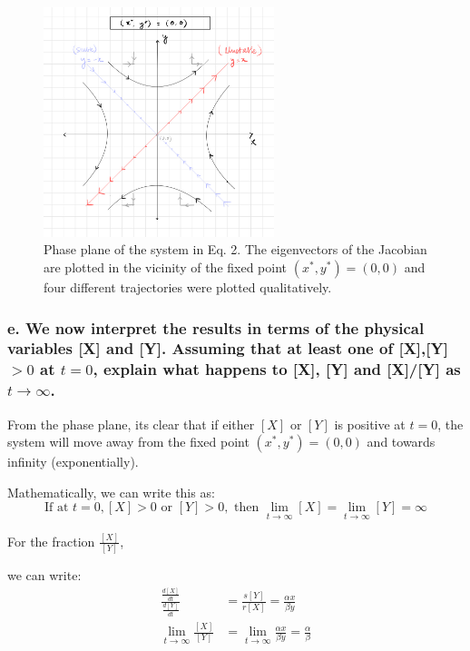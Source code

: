 \documentclass[12pt]{article}
\begin{document}
\begin{figure}[htbp]
    \centering
    \includegraphics[width=0.6\textwidth]{figures/q1_sketch.jpeg}
    \caption{\centering Phase plane of the system in Eq. 2. The eigenvectors of the Jacobian are plotted in the vicinity of the fixed point $(x^*,y^*) = (0,0)$ and four different trajectories were plotted qualitatively.}
\end{figure}

\newpage
\subsubsection*{e. We now interpret the results in terms of the physical variables [X] and [Y]. Assuming that at least one of [X],[Y] $> 0$ at $t=0$, explain what happens to [X], [Y] and [X]/[Y] as $t \to \infty$.}

From the phase plane, its clear that if either $[X]$ or $[Y]$ is positive at
$t=0$, the system will move away from the fixed point $(x^*,y^*) = (0,0)$ and
towards infinity (exponentially).

\noindent
Mathematically, we can write this as:
\begin{equation*}
    \text{If at } t = 0, [X] > 0 \text{ or } [Y] > 0, \text{ then } \lim_{t \to \infty} [X] = \lim_{t \to \infty} [Y] = \infty
\end{equation*}

For the fraction $\frac{[X]}{[Y]}$,

we can write:
\begin{align*}
    \frac{\frac{d[X]}{dt}}{\frac{d[Y]}{dt}} & = \frac{s[Y]}{r[X]} = \frac{\alpha x}{\beta y}                        \\
    \lim_{t \to \infty} \frac{[X]}{[Y]}     & = \lim_{t \to \infty} \frac{\alpha x}{\beta y} = \frac{\alpha}{\beta}
\end{align*}
\end{document}
